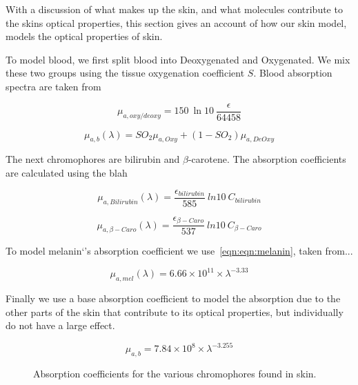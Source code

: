 With a discussion of what makes up the skin, and what molecules contribute to the skins optical properties, this section gives an account of how our skin model, models the optical properties of skin.

To model blood, we first split blood into Deoxygenated and Oxygenated. We mix these two groups using the tissue oxygenation coefficient $S$. Blood absorption spectra are taken from%

\begin{equation}
\mu_{a,oxy/deoxy}=150\ \ln10\ \frac{\epsilon}{64458}
\label{eqn:oxy}
\end{equation}

\begin{equation}
\mu_{a,b}(\lambda) = SO_2\mu_{a,Oxy}+(1-SO_2)\mu_{a,DeOxy}
\label{eqn:blood}
\end{equation}

The next chromophores are bilirubin and $\beta$-carotene.
The absorption coefficients are calculated using the blah 

\begin{equation}
\mu_{a,Bilirubin}(\lambda)=\frac{\epsilon_{bilirubin}}{585}\ ln10\ C_{bilirubin}
\label{eqn:bili}
\end{equation}

\begin{equation}
\mu_{a,\beta-Caro}(\lambda)=\frac{\epsilon_{\beta-Caro}}{537}\ ln10\ C_{\beta-Caro}
\label{eqn:caro}
\end{equation}

To model melanin`'s absorption coefficient we use~\cref{eqn:eqn:melanin}, taken from...

\begin{equation}
\mu_{a,mel}(\lambda)=6.66\times10^{11} \times \lambda^{-3.33}
\label{eqn:eqn:melanin}
\end{equation}

Finally we use a base absorption coefficient to model the absorption due to the other parts of the skin that contribute to its optical properties, but individually do not have a large effect.

\begin{equation}
\mu_{a,b}=7.84\times10^{8}\times\lambda^{-3.255}
\label{eqn:base}
\end{equation}


\begin{figure}[!htpb]
	\centering
	\caption{Absorption coefficients for the various chromophores found in skin.}
	\label{fig:absorcoeff}
\end{figure}





